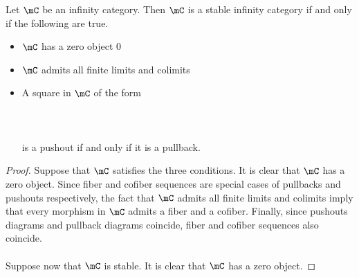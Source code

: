 \documentclass[a4paper]{article}
\begin{document}
\begin{prp}{}{} Let $\mC$ be an infinity category. Then $\mC$ is a stable infinity category if and only if the following are true. 
\begin{itemize}
\item $\mC$ has a zero object $0$
\item $\mC$ admits all finite limits and colimits
\item A square in $\mC$ of the form \\~\\
\\~\\
is a pushout if and only if it is a pullback. 
\end{itemize} \tcbline
\begin{proof}
Suppose that $\mC$ satisfies the three conditions. It is clear that $\mC$ has a zero object. Since fiber and cofiber sequences are special cases of pullbacks and pushouts respectively, the fact that $\mC$ admits all finite limits and colimits imply that every morphism in $\mC$ admits a fiber and a cofiber. Finally, since pushouts diagrams and pullback diagrams coincide, fiber and cofiber sequences also coincide. \\~\\

Suppose now that $\mC$ is stable. It is clear that $\mC$ has a zero object. 
\end{proof}
\end{prp}
\end{document}
